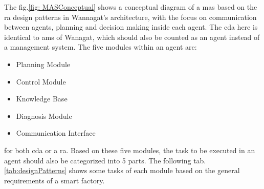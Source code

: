 
The fig.\ref{fig: MASConceptual} shows a conceptual diagram of a \gls{mas} based on the \gls{ra} design patterns in Wannagat’s architecture, with the focus on communication between agents, planning and decision making inside each agent. The \gls{cda} here is identical to \gls{ams} of Wanagat, which should also be counted as an agent instead of a management system. The five modules within an agent are: 
\begin{itemize}
    \item Planning Module
    \item Control Module
    \item Knowledge Base
    \item Diagnosis Module
    \item Communication Interface
\end{itemize}

for both \gls{cda} or a \gls{ra}.
Based on these five modules, the task to be executed in an agent should also be categorized into 5 parts. The following tab.\ref{tab:designPatterns} shows some tasks of each module based on the general requirements of a smart factory.


